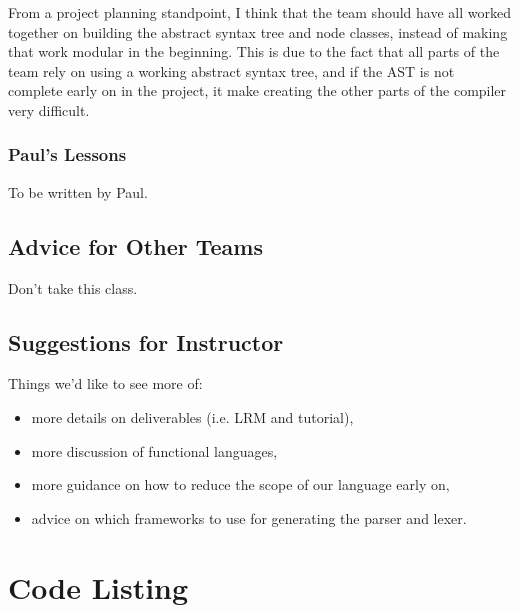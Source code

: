 \documentclass{report}
\begin{document}
From a project planning standpoint, I think that the team should have all worked 
together on building the abstract syntax tree and node classes, instead of making
that work modular in the beginning. This is due to the fact that all parts of the team
rely on using a working abstract syntax tree, and if the AST is not complete early on
in the project, it make creating the other parts of the compiler very difficult. 

\subsection{Paul's Lessons}
\label{sub:pauls-lessons}

To be written by Paul.

\section{Advice for Other Teams}

Don't take this class.

\section{Suggestions for Instructor}

Things we'd like to see more of:

\begin{itemize}
\item more details on deliverables (i.e. LRM and tutorial), 
\item more discussion of functional languages,
\item more guidance on how to reduce the scope of our language early on,
\item advice on which frameworks to use for generating the parser and lexer. 
\end{itemize}

\appendix

\chapter{Code Listing}
\end{document}
